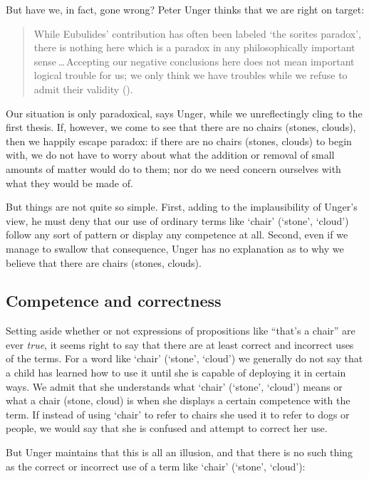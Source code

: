 \documentclass[11pt]{standalone} \newif\ifstandlone \standalonetrue
\newenvironment{squote}{%
	\begin{quote}\begin{singlespace}%
	}{%
	\end{singlespace}\end{quote}}
\begin{document}
\begin{spacing}{1.5}
But have we, in fact, gone wrong?  Peter Unger thinks that we are
right on target:

\begin{squote}
While Eubulides' contribution has often been labeled `the sorites
paradox', there is nothing here which is a paradox in any
philosophically important sense\,\ldots\,Accepting our negative
conclusions here does not mean important logical trouble for us; we
only think we have troubles while we refuse to admit their validity
(\citeyear[145]{unger1979}).
\end{squote}

Our situation is only paradoxical, says Unger, while we unreflectingly
cling to the first thesis.  If, however, we come to see that there are
no chairs (stones, clouds), then we happily escape paradox: if there
are no chairs (stones, clouds) to begin with, we do not have to worry
about what the addition or removal of small amounts of matter would do
to them; nor do we need concern ourselves with what they would be made
of.

But things are not quite so simple.  First, adding to the
implausibility of Unger's view, he must deny that our use of ordinary
terms like `chair' (`stone', `cloud') follow any sort of pattern or
display any competence at all.  Second, even if we manage to swallow
that consequence, Unger has no explanation as to why we believe that
there are chairs (stones, clouds).

\subsection{Competence and correctness}
\label{comp}
Setting aside whether or not expressions of propositions like ``that's
a chair'' are ever \emph{true}, it seems right to say that there are
at least correct and incorrect uses of the terms.  For a word like
`chair' (`stone', `cloud') we generally do not say that a child has
learned how to use it until she is capable of deploying it in certain
ways.  We admit that she understands what `chair' (`stone', `cloud')
means or what a chair (stone, cloud) is when she displays a certain
competence with the term.  If instead of using `chair' to refer to
chairs she used it to refer to dogs or people, we would say that she
is confused and attempt to correct her use.

But Unger maintains that this is all an illusion, and that there is no
such thing as the correct or incorrect use of a term like `chair'
(`stone', `cloud'):


\end{spacing}
\end{document}
